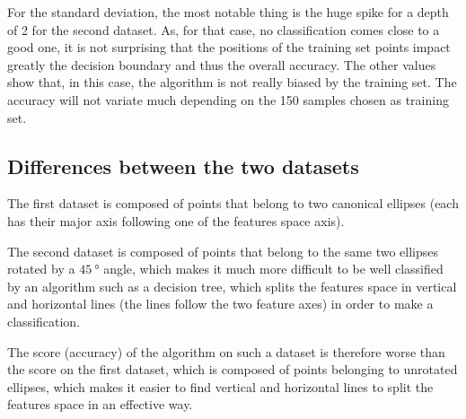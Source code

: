 For the standard deviation, the most notable thing is the huge spike for a depth of 2 for the second dataset. As, for that case, no classification comes close to a good one, it is not surprising that the positions of the training set points impact greatly the decision boundary and thus the overall accuracy. The other values show that, in this case, the algorithm is not really biased by the training set. The accuracy will not variate much depending on the 150 samples chosen as training set.

\subsection{Differences between the two datasets}

The first dataset is composed of points that belong to two canonical ellipses (each has their major axis following one of the features space axis).\par
The second dataset is composed of points that belong to the same two ellipses rotated by a $\SI{45}{\degree}$ angle, which makes it much more difficult to be well classified by an algorithm such as a decision tree, which splits the features space in vertical and horizontal lines (the lines follow the two feature axes) in order to make a classification.\par
The score (accuracy) of the algorithm on such a dataset is therefore worse than the score on the first dataset, which is composed of points belonging to unrotated ellipses, which makes it easier to find vertical and horizontal lines to split the features space in an effective way.

